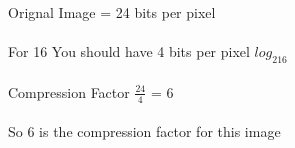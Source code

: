 \begin{answer}
\\ \\
Orignal Image = 24 bits per pixel \\ \\
For 16 You should have 4 bits per pixel $log_216$\\ \\
Compression Factor $\frac{24}{4}$ = 6 \\ \\
So 6 is the compression factor for this image
\end{answer}
